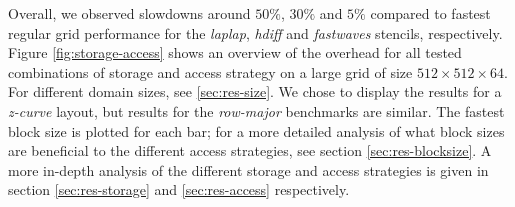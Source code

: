 Overall, we observed slowdowns around $50\%$, $30\%$ and $5\%$ compared to fastest regular grid performance for the \emph{laplap}, \emph{hdiff} and \emph{fastwaves} stencils, respectively. Figure \ref{fig:storage-access} shows an overview of the overhead for all tested combinations of storage and access strategy on a large grid of size $512\times 512\times 64$. For different domain sizes, see \ref{sec:res-size}. We chose to display the results for a \emph{z-curve} layout, but results for the \emph{row-major} benchmarks are similar. The fastest block size is plotted for each bar; for a more detailed analysis of what block sizes are beneficial to the different access strategies, see section \ref{sec:res-blocksize}. A more in-depth analysis of the different storage and access strategies is given in section \ref{sec:res-storage} and \ref{sec:res-access} respectively.